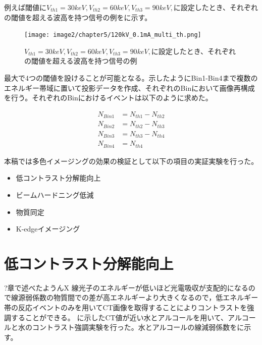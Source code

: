 例えば閾値に$V_{th1}=30keV, V_{th2}=60keV, V_{th3}=90keV,$に設定したとき、それぞれの閾値を超える波高を持つ信号の例をに示す。

\begin{figure}[H]
 \begin{center}
 \texttt{[image: image2/chapter5/120kV\_0.1mA\_multi\_th.png]} 
 \end{center}
 \caption{$V_{th1}=30keV, V_{th2}=60keV, V_{th3}=90keV,$に設定したとき、それぞれの閾値を超える波高を持つ信号の例}
 \label{fig:120kV_0.1mA_multi_th}
\end{figure}

最大で4つの閾値を設けることが可能となる。示したようにBin1-Bin4まで複数のエネルギー帯域に置いて投影データを作成、それぞれのBinにおいて画像再構成を行う。それぞれのBinにおけるイベントは以下のように求めた。

\begin{align}
N_{Bin1}&=N_{th1}-N_{th2}\\
N_{Bin2}&=N_{th2}-N_{th3}\\
N_{Bin3}&=N_{th3}-N_{th4}\\
N_{Bin4}&=N_{th4}
\end{align}


本稿では多色イメージングの効果の検証として以下の項目の実証実験を行った。

\begin{itemize}
\item 低コントラスト分解能向上
\item ビームハードニング低減
\item 物質同定
\item K-edgeイメージング
\end{itemize}


\section{低コントラスト分解能向上}
?章で述べたようんX 線光子のエネルギーが低いほど光電吸収が支配的になるので線源弱係数の物質間での差が高エネルギーより大きくなるので，低エネルギー帯の反応イベントのみを用いてCT画像を取得することによりコントラストを強調することができる。
に示したCT値が近い水とアルコールを用いて、アルコールと水のコントラスト強調実験を行った。水とアルコールの線減弱係数をに示す。

